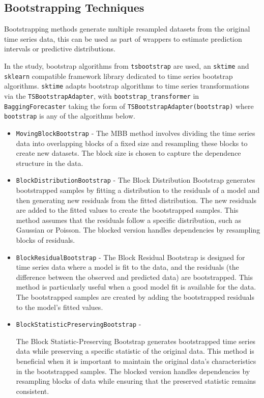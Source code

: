 \subsection{Bootstrapping Techniques}

Bootstrapping methods generate multiple resampled datasets from the original time series data, this can be used as part of wrappers to estimate prediction intervals or predictive distributions.

In the study, bootstrap algorithms from \texttt{tsbootstrap} are used, an \texttt{sktime} and \texttt{sklearn} compatible framework library dedicated to time series bootstrap algorithms. \texttt{sktime} adapts bootstrap algorithms to time series transformations via the \texttt{TSBootstrapAdapter}, with \texttt{bootstrap\_transformer} in \texttt{BaggingForecaster} taking the form of \texttt{TSBootstrapAdapter(bootstrap)} where \texttt{bootstrap} is any of the algorithms below.

\begin{itemize}
    
    \item \texttt{MovingBlockBootstrap} -
    The MBB method involves dividing the time series data into overlapping blocks of a fixed size and resampling these blocks to create new datasets. The block size is chosen to capture the dependence structure in the data. 

    \item \texttt{BlockDistributionBootstrap} -
    The Block Distribution Bootstrap generates bootstrapped samples by fitting a distribution to the residuals of a model and then generating new residuals from the fitted distribution. The new residuals are added to the fitted values to create the bootstrapped samples. This method assumes that the residuals follow a specific distribution, such as Gaussian or Poisson. The blocked version handles dependencies by resampling blocks of residuals.

    \item \texttt{BlockResidualBootstrap} -
    The Block Residual Bootstrap is designed for time series data where a model is fit to the data, and the residuals (the difference between the observed and predicted data) are bootstrapped. This method is particularly useful when a good model fit is available for the data. The bootstrapped samples are created by adding the bootstrapped residuals to the model's fitted values.

    \item \texttt{BlockStatisticPreservingBootstrap} -

    The Block Statistic-Preserving Bootstrap generates bootstrapped time series data while preserving a specific statistic of the original data. This method is beneficial when it is important to maintain the original data's characteristics in the bootstrapped samples. The blocked version handles dependencies by resampling blocks of data while ensuring that the preserved statistic remains consistent.

\end{itemize}

